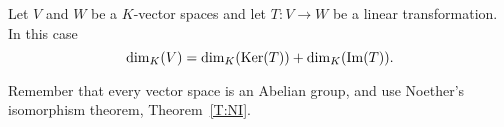 \documentclass{ximera}
\begin{document}


\begin{corollary}
  Let $V$ and $W$ be a $K$-vector spaces and let $T:V\to W$ be a
  linear transformation. In this case
  \[
  \dim_K(V) = \dim_K(\mathop{\mathrm{Ker}}\nolimits(T)) + \dim_K(\operatorname{Im}(T)).
  \]
  \begin{sketch}
    Remember that every vector space is an Abelian group, and use
    Noether's isomorphism theorem, Theorem~\ref{T:NI}.
  \end{sketch}
\end{corollary}
\end{document}
